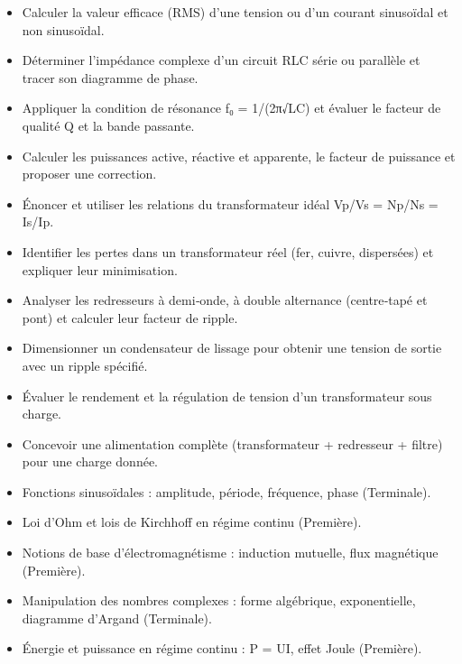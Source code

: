 \documentclass[11pt]{article}
\begin{document}
\begin{objectifs}
\begin{itemize}
\item Calculer la valeur efficace (RMS) d'une tension ou d'un courant sinusoïdal et non sinusoïdal.
\item Déterminer l'impédance complexe d'un circuit RLC série ou parallèle et tracer son diagramme de phase.
\item Appliquer la condition de résonance f₀ = 1/(2π√LC) et évaluer le facteur de qualité Q et la bande passante.
\item Calculer les puissances active, réactive et apparente, le facteur de puissance et proposer une correction.
\item Énoncer et utiliser les relations du transformateur idéal Vp/Vs = Np/Ns = Is/Ip.
\item Identifier les pertes dans un transformateur réel (fer, cuivre, dispersées) et expliquer leur minimisation.
\item Analyser les redresseurs à demi‑onde, à double alternance (centre‑tapé et pont) et calculer leur facteur de ripple.
\item Dimensionner un condensateur de lissage pour obtenir une tension de sortie avec un ripple spécifié.
\item Évaluer le rendement et la régulation de tension d'un transformateur sous charge.
\item Concevoir une alimentation complète (transformateur + redresseur + filtre) pour une charge donnée.
\end{itemize}
\end{objectifs}

\begin{prerequis}
\begin{itemize}
\item Fonctions sinusoïdales : amplitude, période, fréquence, phase (Terminale).
\item Loi d'Ohm et lois de Kirchhoff en régime continu (Première).
\item Notions de base d'électromagnétisme : induction mutuelle, flux magnétique (Première).
\item Manipulation des nombres complexes : forme algébrique, exponentielle, diagramme d'Argand (Terminale).
\item Énergie et puissance en régime continu : P = UI, effet Joule (Première).
\end{itemize}
\end{prerequis}
\end{document}
